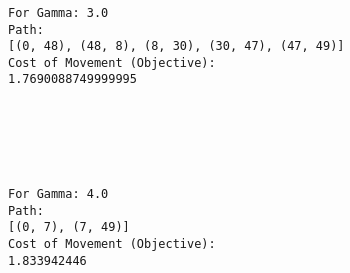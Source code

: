 \documentclass[11pt]{article}
\begin{document}
    \begin{center}
    \end{center}
    { \hspace*{\fill} \\}
    
    \begin{center}
    \end{center}
    { \hspace*{\fill} \\}
    
    \begin{Verbatim}[commandchars=\\\{\}]

For Gamma: 3.0
Path:
[(0, 48), (48, 8), (8, 30), (30, 47), (47, 49)]
Cost of Movement (Objective):
1.7690088749999995

    \end{Verbatim}

    \begin{center}
    \end{center}
    { \hspace*{\fill} \\}
    
    \begin{center}
    \end{center}
    { \hspace*{\fill} \\}
    
    \begin{Verbatim}[commandchars=\\\{\}]

For Gamma: 4.0
Path:
[(0, 7), (7, 49)]
Cost of Movement (Objective):
1.833942446

    \end{Verbatim}

    \begin{center}
    \end{center}
    { \hspace*{\fill} \\}
    
    \begin{center}
    \end{center}
    { \hspace*{\fill} \\}
    

    
    
    
    
\end{document}
